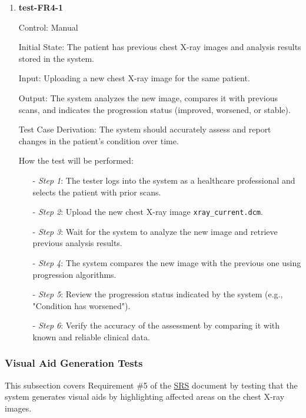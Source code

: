 \documentclass[12pt, titlepage]{article}
\begin{document}
\begin{enumerate}

\item \textbf{test-FR4-1} \label{test-FR4-1}

Control: Manual

Initial State: The patient has previous chest X-ray images and analysis results stored in the system.

Input: Uploading a new chest X-ray image for the same patient.

Output: The system analyzes the new image, compares it with previous scans, and indicates the progression status (improved, worsened, or stable).

Test Case Derivation: The system should accurately assess and report changes in the patient's condition over time.

How the test will be performed:

\begin{itemize}
  \item[-] \textit{Step 1}: The tester logs into the system as a healthcare professional and selects the patient with prior scans.
  \item[-] \textit{Step 2}: Upload the new chest X-ray image \texttt{xray\_current.dcm}.
  \item[-] \textit{Step 3}: Wait for the system to analyze the new image and retrieve previous analysis results.
  \item[-] \textit{Step 4}: The system compares the new image with the previous one using progression algorithms.
  \item[-] \textit{Step 5}: Review the progression status indicated by the system (e.g., "Condition has worsened").
  \item[-] \textit{Step 6}: Verify the accuracy of the assessment by comparing it with known and reliable clinical data.
\end{itemize}

\end{enumerate}

\subsubsection{ Visual Aid Generation Tests}

This subsection covers Requirement \#5 of the \href{https://github.com/RezaJodeiri/CXR-Capstone/blob/main/docs/SRS/SRS.pdf}{SRS} \citep{SRS}
document by testing that the system generates visual aids by highlighting affected areas on the chest X-ray images.
\end{document}

